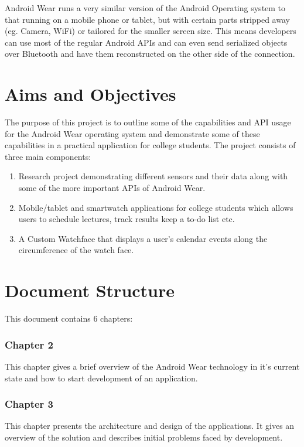 Android Wear runs a very similar version of the Android Operating system to
that running on a mobile phone or tablet, but with certain parts stripped away
(eg. Camera, WiFi) or tailored for the smaller screen size. This means
developers can use most of the regular Android APIs and can even send
serialized objects over Bluetooth and have them reconstructed on the other side
of the connection.

\section{Aims and Objectives}

The purpose of this project is to outline some of the capabilities and API
usage for the Android Wear operating system and demonstrate some of these
capabilities in a practical application for college students. The project
consists of three main components:

\begin{enumerate}

\item Research project demonstrating different sensors and their data along
    with some of the more important APIs of Android Wear.
\item Mobile/tablet and smartwatch applications for college students which
    allows users to schedule lectures, track results keep a to-do list etc.
\item A Custom Watchface that displays a user's calendar events along the
    circumference of the watch face.

\end{enumerate}

\section{Document Structure}

This document contains 6 chapters:

\subsubsection{Chapter 2}
This chapter gives a brief overview of the Android Wear technology in it's
current state and how to start development of an application.

\subsubsection{Chapter 3}
This chapter presents the architecture and design of the applications. It gives
an overview of the solution and describes initial problems faced by development.

